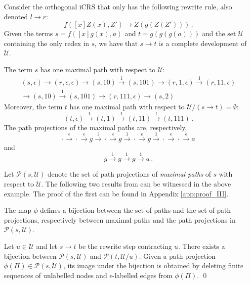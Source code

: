 \documentclass{LMCS}
\theoremstyle{definition}
\newcommand{\rew}{\rightarrow}
\newcommand{\apath}{\Pi}
\begin{document}
\begin{exa}
\label{ex:paths}
Consider the orthogonal iCRS that only has the following rewrite rule, also denoted $l \rew r$:
\[
f([x]Z(x), Z') \rew Z(g(Z(Z'))) \, .
\]
Given the terms $s = f([x]g(x), a)$ and $t = g(g(g(a)))$ and the set $\mathcal{U}$ containing the only redex in $s$, we have that $s \rew t$ is a complete development of $\mathcal{U}$.

The term $s$ has one maximal path with respect to $\mathcal{U}$:
\begin{multline*}
(s, \epsilon)
  \rightarrow (r, \epsilon, \epsilon)
  \rightarrow (s, 10)
  \overset{1}{\rightarrow} (s, 101)
  \rightarrow (r, 1, \epsilon) 
  \overset{1}{\rightarrow} (r, 11, \epsilon)  \\
\rightarrow (s, 10)
  \overset{1}{\rightarrow} (s, 101)
  \rightarrow (r, 111, \epsilon)
  \rightarrow (s, 2)
\end{multline*}
Moreover, the term $t$ has one maximal path with respect to $\mathcal{U}/(s \rew t) = \emptyset$:
\[
(t, \epsilon)
  \overset{1}{\rightarrow} (t, 1)
  \overset{1}{\rightarrow} (t, 11)
  \overset{1}{\rightarrow} (t, 111) \, .
\]
The path projections of the maximal paths are, respectively,
\[
\cdot
  \overset{\epsilon}{\rightarrow} \cdot
  \overset{\epsilon}{\rightarrow} g
  \overset{1}{\rightarrow} \cdot
  \overset{\epsilon}{\rightarrow} g
  \overset{1}{\rightarrow} \cdot
  \overset{\epsilon}{\rightarrow} g
  \overset{1}{\rightarrow} \cdot
  \overset{\epsilon}{\rightarrow} \cdot
  \overset{\epsilon}{\rightarrow} a
\]
and
\[
g
  \overset{1}{\rightarrow} g
  \overset{1}{\rightarrow} g
  \overset{1}{\rightarrow} a \, .
\]
\end{exa}

Let $\mathcal{P}(s, \mathcal{U})$ denote the set of path projections
of \emph{maximal paths} of $s$ with respect to $\mathcal{U}$. The
following two results from \cite{JJ05a} can be witnessed in the above example.
The proof of the first can be found in Appendix \ref{app:proof_III}.

\begin{prop}
\label{prop:phibiject}
The map $\phi$ defines a bijection between the set of paths and the set
of path projections, respectively between maximal paths and the path
projections in $\mathcal{P}(s, \mathcal{U})$.
\end{prop}

\begin{lem}
\label{unlabeldel}
Let $u \in \mathcal{U}$ and let $s \rew t$ be the rewrite step contracting $u$. There exists a bijection between $\mathcal{P}(s, \mathcal{U})$ and $\mathcal{P}(t, \mathcal{U}/u)$. Given a path projection $\phi(\apath) \in \mathcal{P}(s, \mathcal{U})$, its image under the bijection is obtained by deleting finite sequences of unlabelled nodes and $\epsilon$-labelled edges from $\phi(\apath)$. \qed
\end{lem}
\end{document}
